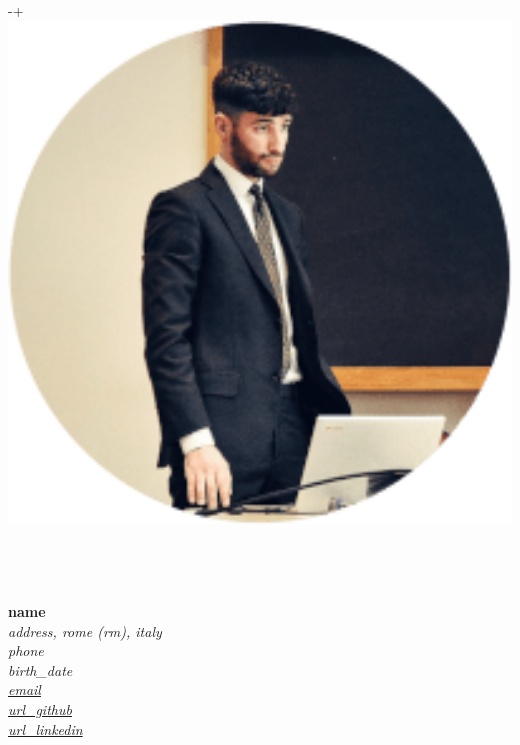 \documentclass{article}
\begin{document}

\begin{minipage}[t]{.25\textwidth}
	\raisebox
	{\dimexpr-\height+\ht\strutbox\relax}
	{\includegraphics[width=1\textwidth]{profile.png}} \hfill \\\\\\\\
\end{minipage}
\begin{minipage}[t]{.7\textwidth}
	\begin{flushright}
		\vfill \textbf{\huge{{{name}}}} \\ \hfill \vfill
		\textit{
			{{address}}, {{rome}} ({{rm}}), {{italy}} \hspace{1mm} \color{lightergray}\faHome\color{black} \\
			{{phone}} \hspace{1mm} \color{lightergray}\faPhone\color{black} \\
			{{birth_date}} \hspace{1mm} \color{lightergray}\faCalendar\color{black} \\
			\href{mailto:{{email}}}{{{email}}} \hspace{1mm} \color{lightergray}\faEnvelope\color{black} \\
			\href{{{url_github}}}{{{url_github}}} \hspace{1mm} \color{lightergray}\faGithubSquare\color{black} \\
			\href{{{url_linkedin}}}{{{url_linkedin}}} \hspace{1mm} \color{lightergray}\faLinkedinSquare\color{black} \\
		}
	\end{flushright}
\end{minipage}
\end{document}
